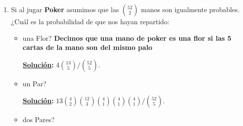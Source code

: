 \documentclass[11pt,letterpaper]{report}
\newcommand{\N}{\mathbb{N}}
\newcommand{\sol}{\textbf{\underline{Solución}: }} %
\begin{document}
\begin{enumerate}
\begin{itemize}
    \item Define los siguientes eventos en terminos de $S$.
    
    Asume que $A$ lanza primero la moneda, denoganar lanza $B$, de no ganarlanza $C$ y en
    caso de no ganar nadie se repite el proceso.    

    \sol (Asumiendo que $A$ tiró, luego $B$ y al final $C$ y así consecutivamente.)

    \begin{enumerate}[label=\alph*)]
        \item $A$ gana = $A$
        
        $A$ gana si y solo si hay $3n$ 0's precedidos de él (un \texttt{1}),
        ósea $\underbrace{0 \cdots 0}_{3n} 1$ con $n \in \N$.

        \item $B$ gana = $B$
        
        $B$ gana si y solo si hay $3n+1$ 0's precedidos de él (un \texttt{1}),
        ósea $\underbrace{0 \cdots 0}_{3n+1} 1$ con $n \in \N$.

        \item $(A \cup B)^c$
        
        Este evento significa que $C$ ganó o nadie ganó. Para definir el evento en el que $C$ ganó
        sería análogo a los incisos anteriores, ósea $\underbrace{0 \cdots 0}_{3n+2} 1$, y para
        definir que nadie ganó sería $000\cdots$.
        
    \end{enumerate}

\end{itemize}

\item Si al jugar \textbf{Poker} asumimos que las $\binom{52}{2}$ manos son igualmente probables.
¿Cuál es la probabilidad de que nos hayan repartido:

\begin{itemize}
    \item una Flor? \textbf{Decimos que una mano de poker es una flor si las 5 cartas de la mano son
    del mismo palo} %

    \sol $4\binom{13}{5}/\binom{52}{5}$.
    
    \item un Par?

    \sol $13\binom{4}{2}\binom{12}{3}\binom{4}{1}\binom{4}{1}\binom{4}{1}/\binom{52}{5}$.

    \item dos Pares?


\end{itemize}
\end{enumerate}
\end{document}
